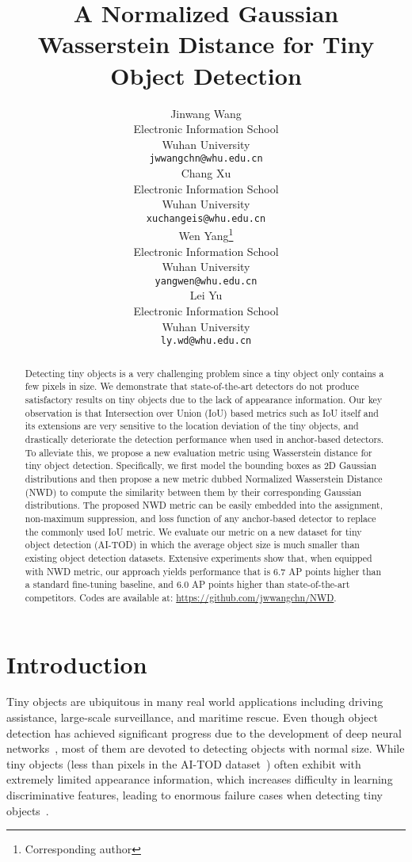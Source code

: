 \documentclass{article}
\title{A Normalized Gaussian Wasserstein Distance for Tiny Object Detection}
\author{Jinwang Wang \\
  Electronic Information School\\
  Wuhan University\\
  \texttt{jwwangchn@whu.edu.cn} \\
\And
  Chang Xu \\
  Electronic Information School\\
  Wuhan University\\
  \texttt{xuchangeis@whu.edu.cn} \\
  \And
  Wen Yang\thanks{Corresponding author} \\
  Electronic Information School\\
  Wuhan University\\
  \texttt{yangwen@whu.edu.cn} \\
  \And
  Lei Yu \\
  Electronic Information School\\
  Wuhan University\\
  \texttt{ly.wd@whu.edu.cn} \\
}
\begin{document}
\maketitle

\begin{abstract}
Detecting tiny objects is a very challenging problem since a tiny object only contains a few pixels in size. We demonstrate that state-of-the-art detectors do not produce satisfactory results on tiny objects due to the lack of appearance information. Our key observation is that Intersection over Union (IoU) based metrics such as IoU itself and its extensions are very sensitive to the location deviation of the tiny objects, and drastically deteriorate the detection performance when used in anchor-based detectors. To alleviate this, we propose a new evaluation metric using Wasserstein distance for tiny object detection. Specifically, we first model the bounding boxes as 2D Gaussian distributions and then propose a new metric dubbed Normalized Wasserstein Distance (NWD) to compute the similarity between them by their corresponding Gaussian distributions. The proposed NWD metric can be easily embedded into the assignment, non-maximum suppression, and loss function of any anchor-based detector to replace the commonly used IoU metric. We evaluate our metric on a new dataset for tiny object detection (AI-TOD) in which the average object size is much smaller than existing object detection datasets. Extensive experiments show that, when equipped with NWD metric, our approach yields performance that is 6.7 AP points higher than a standard fine-tuning baseline, and 6.0 AP points higher than state-of-the-art competitors. Codes are available at: \url{https://github.com/jwwangchn/NWD}.

\end{abstract}

\section{Introduction}

Tiny objects are ubiquitous in many real world applications including driving assistance, large-scale surveillance, and maritime rescue. Even though object detection has achieved significant progress due to the development of deep neural networks~\cite{Faster-R-CNN_2015_NIPS,Focal-Loss_2017_ICCV,FCOS_2019_ICCV}, most of them are devoted to detecting objects with normal size. While tiny objects (less than  pixels in the AI-TOD dataset~\cite{AI-TOD_2020_ICPR}) often exhibit with extremely limited appearance information, which increases difficulty in learning discriminative features, leading to enormous failure cases when detecting tiny objects~\cite{SNIPER_2018_NIPS,AI-TOD_2020_ICPR,TinyPerson_2020_WACV}.
\end{document}
